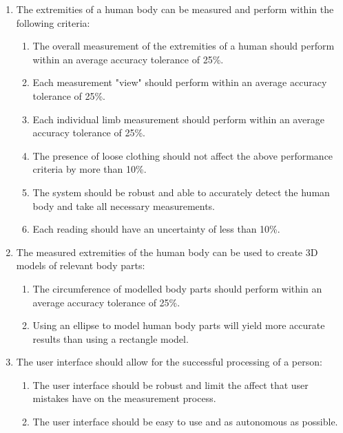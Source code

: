 \begin{enumerate}
	\item The extremities of a human body can be measured and perform within the following criteria:
	\begin{enumerate}
		\item The overall measurement of the extremities of a human should perform within an average accuracy tolerance of 25\%.
		\item Each measurement "view" should perform within an average accuracy tolerance of 25\%.
		\item Each individual limb measurement should perform within an average accuracy tolerance of 25\%.
		\item The presence of loose clothing should not affect the above performance criteria by more than 10\%.
		\item The system should be robust and able to accurately detect the human body and take all necessary measurements. 
		\item Each reading should have an uncertainty of less than 10\%. 
	\end{enumerate}
	\item The measured extremities of the human body can be used to create 3D models of relevant body parts: 
	\begin{enumerate}
		\item The circumference of modelled body parts should perform within an average accuracy tolerance of 25\%.
		\item Using an ellipse to model human body parts will yield more accurate results than using a rectangle model. 
	\end{enumerate}
	\item The user interface should allow for the successful processing of a person: 
	\begin{enumerate}
		\item The user interface should be robust and limit the affect that user mistakes have on the measurement process.
		\item The user interface should be easy to use and as autonomous as possible.
	\end{enumerate}
\end{enumerate}
